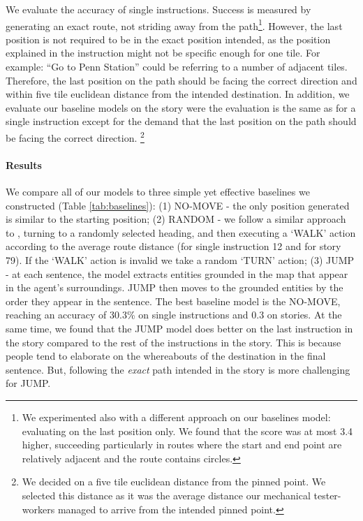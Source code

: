 \documentclass[11pt,a4paper]{article}
\begin{document}
We evaluate the accuracy of single instructions. Success is measured by generating an exact route, not striding away from the path\footnote{We experimented also with a different approach on our baselines model: evaluating on the last position only. We found that the score was at most 3.4 higher, succeeding particularly in routes where the start and end point are relatively adjacent and the route contains circles.}. However, the last position is not required to be in the exact position intended, as the position explained in the instruction might not be specific enough for one tile. For example: \enquote{Go to Penn Station} could be referring to a number of adjacent tiles. Therefore, the last position on the path should be facing the correct direction and within five tile euclidean distance from the intended destination. In addition, we evaluate our baseline models on the story were the evaluation is the same as for a single instruction except for the demand that the last position on the path should be facing the correct direction. \footnote{We decided on a five tile euclidean distance from the pinned point. We selected this distance as it was the average distance our mechanical tester-workers managed to arrive from the intended pinned point.} 



\paragraph{Results}

We compare all of our models to three simple yet effective baselines we constructed (Table \ref{tab:baselines}): (1) NO-MOVE - the only position generated is similar to the starting position; (2) RANDOM - we follow a similar approach to \citet{anderson2018vision}, turning to a randomly selected heading, and then executing a \enquote*{WALK} action according to the average route distance (for single instruction 12 and for story 79). If the \enquote*{WALK} action is invalid we take a random \enquote*{TURN} action; (3) JUMP - at each sentence, the model extracts entities grounded in the map that appear in the agent's surroundings. JUMP then moves to the grounded entities by the order they appear in the sentence.
The best baseline model is the NO-MOVE, reaching an accuracy of 30.3\% on single instructions and 0.3 on stories. At the same time,
we found that the JUMP model does better on the last instruction in the story compared to the rest of the instructions in the story. This is because people tend to elaborate on the whereabouts of the destination in the final sentence. But, following the {\em exact} path intended in the story is more challenging for JUMP.   \par
\end{document}
